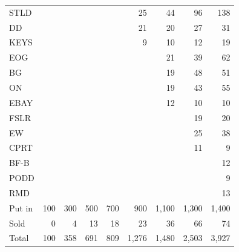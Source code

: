 \documentclass[11pt,a4paper]{article}
\begin{document}
\begin{table}[H]
\begin{tabular}{l r r r r r r r r }
STLD &  &  &  &  & 25 & 44 & 96 & 138 \\
DD &  &  &  &  & 21 & 20 & 27 & 31 \\
KEYS &  &  &  &  & 9 & 10 & 12 & 19 \\
EOG &  &  &  &  &  & 21 & 39 & 62 \\
BG &  &  &  &  &  & 19 & 48 & 51 \\
ON &  &  &  &  &  & 19 & 43 & 55 \\
EBAY &  &  &  &  &  & 12 & 10 & 10 \\
FSLR &  &  &  &  &  &  & 19 & 20 \\
EW &  &  &  &  &  &  & 25 & 38 \\
CPRT &  &  &  &  &  &  & 11 & 9 \\
BF-B &  &  &  &  &  &  &  & 12 \\
PODD &  &  &  &  &  &  &  & 9 \\
RMD &  &  &  &  &  &  &  & 13 \\
\hline
Put in & 100 & 300 & 500 & 700 & 900 & 1,100 & 1,300 & 1,400 \\
Sold & 0 & 4 & 13 & 18 & 23 & 36 & 66 & 74 \\
Total & 100 & 358 & 691 & 809 & 1,276 & 1,480 & 2,503 & 3,927 \\
\hline
\end{tabular}
\end{table}
\end{document}
